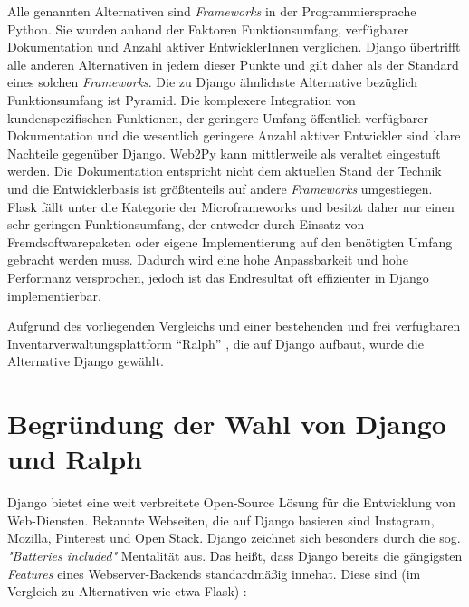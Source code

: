 Alle genannten Alternativen sind
\emph{Frameworks}
in der Programmiersprache Python. Sie wurden anhand der Faktoren
Funktionsumfang, verfügbarer Dokumentation und Anzahl aktiver
EntwicklerInnen verglichen. Django übertrifft alle anderen Alternativen
in jedem dieser Punkte und gilt daher als der Standard eines solchen
\emph{Frameworks}.
Die zu Django ähnlichste Alternative bezüglich Funktionsumfang ist
Pyramid. Die komplexere Integration von kundenspezifischen Funktionen,
der geringere Umfang öffentlich verfügbarer Dokumentation und die
wesentlich geringere Anzahl aktiver Entwickler sind klare Nachteile
gegenüber Django. Web2Py kann mittlerweile als veraltet eingestuft
werden. Die Dokumentation entspricht nicht dem aktuellen Stand der
Technik und die Entwicklerbasis ist größtenteils auf andere
\emph{Frameworks}
umgestiegen. Flask fällt unter die Kategorie der Microframeworks und
besitzt daher nur einen sehr geringen Funktionsumfang, der entweder
durch Einsatz von Fremdsoftwarepaketen oder eigene Implementierung auf
den benötigten Umfang gebracht werden muss. Dadurch wird eine hohe
Anpassbarkeit und hohe Performanz versprochen, jedoch ist das
Endresultat oft effizienter in Django implementierbar.

Aufgrund des vorliegenden Vergleichs und einer bestehenden und frei
verfügbaren Inventarverwaltungsplattform ``Ralph'' \cite{ralph}, die auf
Django aufbaut, wurde die Alternative Django gewählt.

\hypertarget{begruxfcndung-der-wahl-von-django-und-ralph}{%
\section{Begründung der Wahl von Django und
Ralph}\label{begruxfcndung-der-wahl-von-django-und-ralph}}

Django bietet eine weit verbreitete Open-Source Lösung für die
Entwicklung von Web-Diensten. Bekannte Webseiten, die auf Django
basieren sind \ua{} Instagram, Mozilla, Pinterest und Open Stack.
\cite{django-overview} Django zeichnet sich besonders durch die sog.
\emph{"Batteries included"}
Mentalität aus. Das heißt, dass Django bereits die gängigsten
\emph{Features}
eines Webserver-Backends standardmäßig innehat. Diese sind (im Vergleich
zu Alternativen wie etwa Flask) \ua{}:


